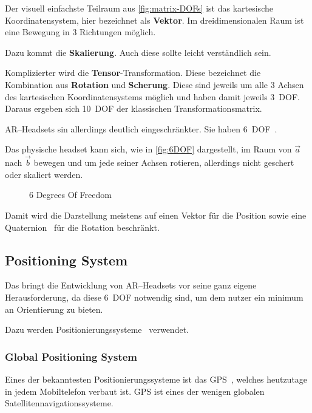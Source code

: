     Der visuell einfachste Teilraum aus \autoref{fig:matrix-DOFs} ist das kartesische Koordinatensystem, hier bezeichnet als \textbf{Vektor}.
    Im dreidimensionalen Raum ist eine Bewegung in 3 Richtungen möglich.

    Dazu kommt die \textbf{Skalierung}.
    Auch diese sollte leicht verständlich sein.

    Komplizierter wird die \textbf{Tensor}-Transformation.
    Diese bezeichnet die Kombination aus \textbf{Rotation} und \textbf{Scherung}.
    Diese sind jeweils um alle 3 Achsen des kartesischen Koordinatensystems möglich und haben damit jeweils 3~DOF\@.
    Daraus ergeben sich 10~DOF der klassischen Transformationsmatrix.

    AR--Headsets sin allerdings deutlich eingeschränkter.
    Sie haben 6~DOF~\autocite{wikipedia-contributors-2023B}.

    Das physische headset kann sich, wie in \autoref{fig:6DOF} dargestellt, im Raum von $\vec{a}$ nach $\vec{b}$ bewegen und um jede seiner Achsen rotieren, allerdings nicht geschert oder skaliert werden.
    \begin{figure}[ht!]
        \label{fig:6DOF}
        \center
        
        \caption{6 Degrees Of Freedom~\autocite{wikipedia-contributors-2023B}}
    \end{figure}
    Damit wird die Darstellung meistens auf einen Vektor für die Position sowie eine Quaternion~\autocite{wikipedia-contributors-2023G} für die Rotation beschränkt.

\subsection{Positioning System}\label{subsec:positioning-system}
    Das bringt die Entwicklung von AR--Headsets vor seine ganz eigene Herausforderung, da diese 6~DOF notwendig sind, um dem nutzer ein minimum an Orientierung zu bieten.

    Dazu werden Positionierungssysteme~\autocite{wikipedia-contributors-2023A} verwendet.

    \subsubsection{Global Positioning System}\label{subsubsec:global-positioning-system}
        Eines der bekanntesten Positionierungssysteme ist das GPS~\autocite{wikipedia-contributors-2023J}, welches heutzutage in jedem Mobiltelefon verbaut ist.
        GPS ist eines der wenigen globalen Satellitennavigationssysteme.

